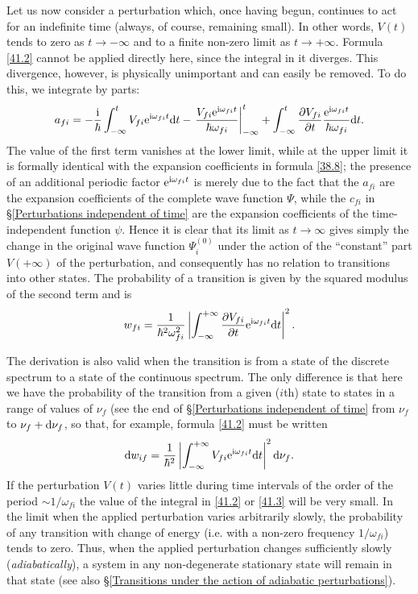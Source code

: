 Let us now consider a perturbation which, once having begun, continues to act for an indefinite time (always, of course, remaining small). In other words, $ V (t) $ tends to zero as $ t → -\infty $ and to a finite non-zero limit as $ t \to+\infty $. Formula \eqref{41.2} cannot be applied directly here, since the integral in it diverges. This divergence, however, is physically unimportant and can easily be removed. To do this, we integrate by parts:
\[ a_{fi}=-\frac{\mathrm{i}}{\hbar}\int_{-\infty}^{t}V_{fi}\mathrm{e}^{\mathrm{i}\omega_{fi}t}\mathrm{d} t-\left.\frac{V_{fi}\mathrm{e}^{\mathrm{i}\omega_{fi}t}}{\hbar\omega_{fi}}\right|_{-\infty}^t+\int_{-\infty}^t\frac{\partial V_{fi}}{\partial t}\frac{\mathrm{e}^{\mathrm{i}\omega_{fi}t}}{\hbar\omega_{fi}}\mathrm{d} t. \]
The value of the first term vanishes at the lower limit, while at the upper limit it is formally identical with the expansion coefficients in formula \eqref{38.8}; the presence of an additional periodic factor $ \mathrm{e}^{\mathrm{i}\omega_{fi}t} $ is merely due to the fact that the $ a_{fi} $ are the expansion coefficients of the complete wave function $\Psi$, while the $ c_{fi} $ in \S\ref{Perturbations independent of time} are the expansion coefficients of the time-independent function $\psi$. Hence it is clear that its limit as $ t \to\infty $ gives simply the change in the original wave function $ Ψ_i^{(0)} $ under the action of the “constant” part $ V (+\infty) $ of the perturbation, and consequently has no relation to transitions into other states. The probability of a transition is given by the squared modulus of the second term and is
\begin{equation}\label{41.3}
w_{fi}=\frac{1}{\hbar^2\omega_{fi}^2}\left|\int_{-\infty}^{+\infty}\frac{\partial V_{fi}}{\partial t}\mathrm{e}^{\mathrm{i}\omega_{fi}t}\mathrm{d} t \right|^2.
\end{equation}



The derivation is also valid when the transition is from a state of the discrete spectrum to a state of the continuous spectrum. The only difference is that here we have the probability of the transition from a given ($ i $th) state to states in a range of values of $ \nu_f $ (see the end of \S\ref{Perturbations independent of time} from $ \nu_f $ to $ \nu_f+\mathrm{d}\nu_f $, so that, for example, formula \eqref{41.2} must be written
\begin{equation}\label{41.4}
\mathrm{d} w_{if}=\frac{1}{\hbar^2}\left|\int_{-\infty}^{+\infty}V_{fi}\mathrm{e}^{\mathrm{i}\omega_{fi}t}\mathrm{d} t \right|^2\mathrm{d}\nu_f.
\end{equation}
If the perturbation $ V (t) $ varies little during time intervals of the order of the period $ \sim1/\omega_{fi} $ the value of the integral in \eqref{41.2} or \eqref{41.3} will be very small. In the limit when the applied perturbation varies arbitrarily slowly, the probability of any transition with change of energy (i.e. with a non-zero frequency $ 1/\omega_{fi} $) tends to zero. Thus, when the applied perturbation changes sufficiently slowly (\textit{adiabatically}), a system in any non-degenerate stationary state will remain in that state (see also \S\ref{Transitions under the action of adiabatic perturbations}).

